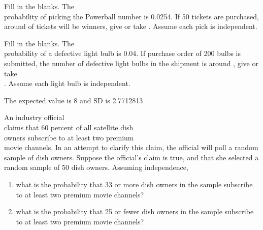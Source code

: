 \documentclass[11pt]{book}\usepackage[]{graphicx}\usepackage[]{color}
\begin{document}
\begin{exercises}
\begin{solution}
  \end{solution}

	\begin{exercise}  %

Fill in the blanks. The \\ probability of picking the Powerball number is  0.0254. If 50 tickets are purchased, around \underline{\phantom{xxxxxxxx}} of  tickets will be winners,  give or take  \underline{\phantom{xxxxxxxx}}.    Assume each pick is independent.
	\end{exercise}
%

		\begin{exercise}  %

Fill in the blanks. The \\ probability of a defective light bulb is 0.04. If purchase order of 200 bulbs is submitted, the number of defective light bulbs in the shipment is around \underline{\phantom{xxxxxxxx}}, give or take \\ \underline{\phantom{xxxxxxxx}}. Assume each light bulb is independent.
	  \end{exercise}
	  \begin{solution}  %


The expected value is 8 and SD is 2.7712813
	\end{solution}

  \begin{exercise}   %

An industry official \\ claims that 60 percent of all satellite dish \\ owners subscribe to at least two premium \\ movie  channels.  In an attempt to clarify this claim, the official will poll a random sample of dish owners.  Suppose the official's claim is true, and that she selected a random sample of 50 dish owners.  Assuming independence,

\begin{enumerate}
\item what is the probability that 33 or more dish owners in the sample subscribe to at least two premium movie channels?
\item what is the probability that 25 or fewer dish owners in the sample subscribe to at least two premium movie channels?
\end{enumerate}
\end{exercise}
\begin{solution}




\end{solution}
\end{exercises}
\end{document}
